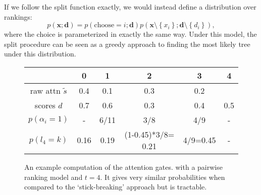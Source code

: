 \documentclass{article}
\newcommand\set[1]{\left\{#1\right\}}
\newcommand{\bd}{\mathbf{d}}
\newcommand{\bx}{\mathbf{x}}
\begin{document}
If we follow the split function exactly, we would instead define a distribution over rankings:
\begin{equation}
p(\bx;\bd) = p(\textrm{choose}= i; \bd)p(\bx\setminus\set{x_i}; \bd\setminus\set{d_i}),
\end{equation}
where the choice is parameterized in exactly the same way.
Under this model, the split procedure can be seen as a greedy approach to finding
the most likely tree under this distribution.

\begin{figure}
\centering
\begin{tabular}{|c|c|c|c|c|c|}
\hline
& 0 & 1 & 2 & 3 & 4\\
\hline
raw attn $\tilde{s}$ & 0.4 & 0.1 & 0.3 & 0.2 & \\
\hline
scores $d$         & 0.7 & 0.6 & 0.3 & 0.4 & 0.5\\
\hline
$p(\alpha_i=1)$    & - & 6/11 & 3/8 & 4/9 & -\\
\hline
$p(l_4=k)$ & 0.16 & 0.19 & (1-0.45)*3/8= 0.21 & 4/9=0.45 & -\\
\hline
\end{tabular}
\caption{An example computation of the attention gates.
with a pairwise ranking model and $t=4$.
It gives very similar probabilities when compared to the `stick-breaking' approach but is tractable.}
\label{fig:geom}
\end{figure}
\end{document}
